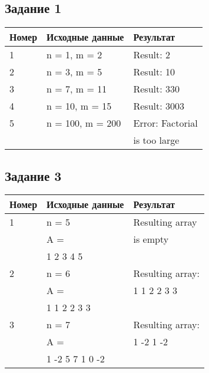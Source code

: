 \begin{minipage}[t]{0.5\textwidth}
\subsection*{\centering Задание 1}
\begin{tabular}{|l|l|l|}
    \hline
    Номер & Исходные данные & Результат\\[2ex]
    \hline
    1 & n = 1, m = 2 & Result: 2\\[2ex]
    \hline
    2 & n = 3, m = 5 & Result: 10\\[2ex]
    \hline
    3 & n = 7, m = 11 & Result: 330\\[2ex]
    \hline
    4 & n = 10, m = 15 & Result: 3003\\[2ex]
    \hline
    5 & n = 100, m = 200 & Error: Factorial\\
    && is too large\\
    \hline
\end{tabular}

\subsection*{\centering Задание 3}
\begin{tabular}{|l|l|l|}
  \hline
  Номер & Исходные данные & Результат\\[2ex]
  \hline  
  1 & n = 5               & Resulting array\\
    & A =                 & is empty\\
    & 1 2 3 4 5           & \\
  \hline
  2 & n = 6               & Resulting array: \\
    & A =                 & 1 1 2 2 3 3 \\
    & 1 1 2 2 3 3         & \\
  \hline
  3 & n = 7               & Resulting array: \\
    & A =                 & 1 -2 1 -2 \\
    & 1 -2 5 7 1 0 -2     & \\
  \hline
\end{tabular}
\end{minipage}%
\hfil
